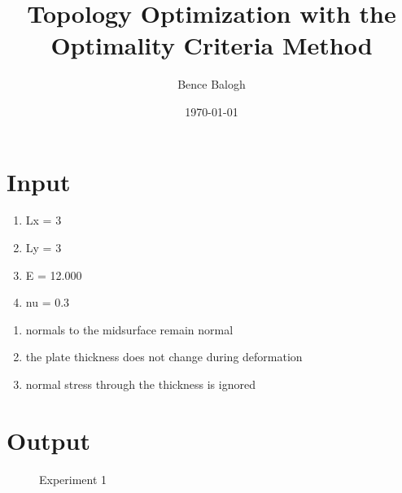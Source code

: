 \documentclass{article}%
\title{Topology Optimization with the Optimality Criteria Method}%
\author{Bence Balogh}%
\date{\today}%
\begin{document}
%
\normalsize%
\maketitle%
\tableofcontents%
\newpage%
\section{Input}%
\label{sec:Input}%

        \begin{enumerate}
        \item  Lx = 3
        \item  Ly = 3
        \item  E = 12.000
        \item  nu = 0.3
        \end{enumerate}

        \begin{enumerate}[label*=\protect\fbox{MR\arabic{enumi}},
        itemindent=5em]
        \item   normals to the midsurface remain normal
        \item   the plate thickness does not change during deformation
        \item   normal stress through the thickness is ignored
        \end{enumerate}
        

%
\section{Output}%
\label{sec:Output}%

        \begin{figure}[htp] 
        \caption{Experiment 1}
        \end{figure}  
        

%
\end{document}
